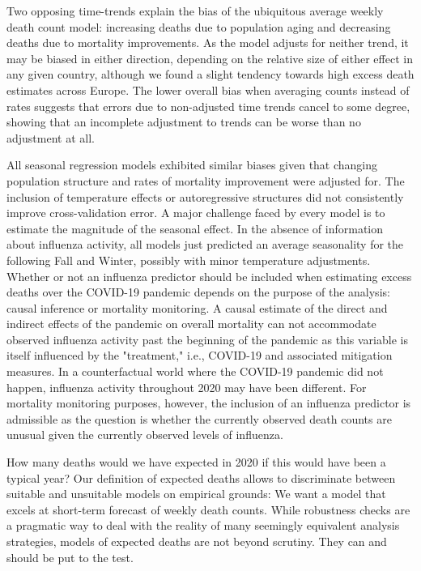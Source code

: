 \documentclass[12pt]{article}
\begin{document}
Two opposing time-trends explain the bias of the ubiquitous average weekly death count model: increasing deaths due to population aging and decreasing deaths due to mortality improvements. As the model adjusts for neither trend, it may be biased in either direction, depending on the relative size of either effect in any given country, although we found a slight tendency towards high excess death estimates across Europe. The lower overall bias when averaging counts instead of rates suggests that errors due to non-adjusted time trends cancel to some degree, showing that an incomplete adjustment to trends can be worse than no adjustment at all.

All seasonal regression models exhibited similar biases given that changing population structure and rates of mortality improvement were adjusted for. The inclusion of temperature effects or autoregressive structures did not consistently improve cross-validation error. A major challenge faced by every model is to estimate the magnitude of the seasonal effect. In the absence of information about influenza activity, all models just predicted an average seasonality for the following Fall and Winter, possibly with minor temperature adjustments. Whether or not an influenza predictor should be included when estimating excess deaths over the COVID-19 pandemic depends on the purpose of the analysis: causal inference or mortality monitoring. A causal estimate of the direct and indirect effects of the pandemic on overall mortality can not accommodate observed influenza activity past the beginning of the pandemic as this variable is itself influenced by the "treatment," i.e., COVID-19 and associated mitigation measures. In a counterfactual world where the COVID-19 pandemic did not happen, influenza activity throughout 2020 may have been different. For mortality monitoring purposes, however, the inclusion of an influenza predictor is admissible as the question is whether the currently observed death counts are unusual given the currently observed levels of influenza.

How many deaths would we have expected in 2020 if this would have been a typical year? Our definition of expected deaths allows to discriminate between suitable and unsuitable models on empirical grounds: We want a model that excels at short-term forecast of weekly death counts. While robustness checks are a pragmatic way to deal with the reality of many seemingly equivalent analysis strategies, models of expected deaths are not beyond scrutiny. They can and should be put to the test.
\end{document}
